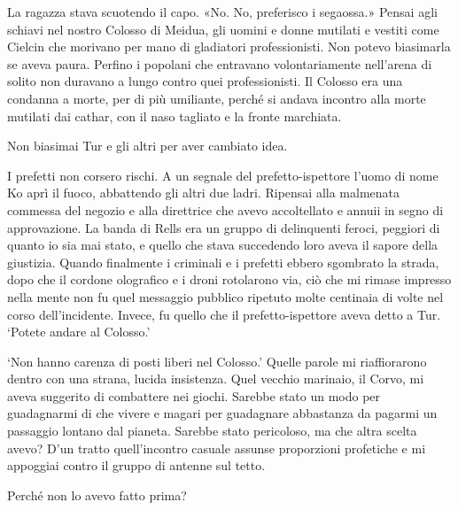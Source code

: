 La ragazza stava scuotendo il capo. «No. No, preferisco i segaossa.»
Pensai agli schiavi nel nostro Colosso di Meidua, gli uomini e donne
mutilati e vestiti come Cielcin che morivano per mano di gladiatori
professionisti. Non potevo biasimarla se aveva paura. Perfino i popolani
che entravano volontariamente nell'arena di solito non duravano a lungo
contro quei professionisti. Il Colosso era una condanna a morte, per di
più umiliante, perché si andava incontro alla morte mutilati dai cathar,
con il naso tagliato e la fronte marchiata.

Non biasimai Tur e gli altri per aver cambiato idea.

I prefetti non corsero rischi. A un segnale del prefetto-ispettore
l'uomo di nome Ko aprì il fuoco, abbattendo gli altri due ladri.
Ripensai alla malmenata commessa del negozio e alla direttrice che avevo
accoltellato e annuii in segno di approvazione. La banda di Rells era un
gruppo di delinquenti feroci, peggiori di quanto io sia mai stato, e
quello che stava succedendo loro aveva il sapore della giustizia. Quando
finalmente i criminali e i prefetti ebbero sgombrato la strada, dopo che
il cordone olografico e i droni rotolarono via, ciò che mi rimase
impresso nella mente non fu quel messaggio pubblico ripetuto molte
centinaia di volte nel corso dell'incidente. Invece, fu quello che il
prefetto-ispettore aveva detto a Tur. `Potete andare al Colosso.'

`Non hanno carenza di posti liberi nel Colosso.' Quelle parole mi
riaffiorarono dentro con una strana, lucida insistenza. Quel vecchio
marinaio, il Corvo, mi aveva suggerito di combattere nei giochi. Sarebbe
stato un modo per guadagnarmi di che vivere e magari per guadagnare
abbastanza da pagarmi un passaggio lontano dal pianeta. Sarebbe stato
pericoloso, ma che altra scelta avevo? D'un tratto quell'incontro
casuale assunse proporzioni profetiche e mi appoggiai contro il gruppo
di antenne sul tetto.

Perché non lo avevo fatto prima?

